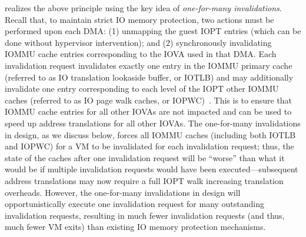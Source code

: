 {\name} realizes the above principle using the key idea of \textit{one-for-many invalidations}. 
Recall that, to maintain strict IO memory protection, two actions must be performed upon each DMA: 
(1) unmapping the guest IOPT entries (which can be done without hypervisor intervention); 
and (2) synchronously invalidating IOMMU cache entries corresponding to the IOVA used in that DMA. 
Each invalidation request invalidates exactly one entry in the IOMMU primary cache 
    (referred to as IO translation lookaside buffer, or IOTLB) 
    and may additionally invalidate one entry corresponding to each level of the IOPT other IOMMU caches 
    (referred to as IO page walk caches, or IOPWC)~\cite{Rubin2024FastSafe}. 
This is to ensure that IOMMU cache entries for all other IOVAs are not impacted 
    and can be used to speed up address translations for all other IOVAs. 
The one-for-many invalidations in {\name} design, as we discuss below, 
    forces all IOMMU caches (including both IOTLB and IOPWC) 
    for a VM to be invalidated for each invalidation request; 
    thus, the state of the caches after one invalidation request will be ``worse'' 
    than what it would be if multiple invalidation requests would have been executed---subsequent 
    address translations may now require a full IOPT walk increasing translation overheads. 
    However, the one-for-many invalidations in {\name} design will opportunistically execute one 
    invalidation request for many outstanding invalidation requests, 
    resulting in much fewer invalidation requests (and thus, much fewer VM exits) than existing IO memory protection mechanisms.


